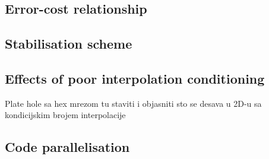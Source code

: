 \documentclass[sn-mathphys,Numbered]{sn-jnl}%
\newcommand{\bb}{\boldsymbol}
\begin{document}
\subsection{Error-cost relationship}

\subsection{Stabilisation scheme}

\subsection{Effects of poor interpolation conditioning}

Plate hole sa hex mrezom tu staviti i objasniti sto se desava u 2D-u sa kondicijskim brojem interpolacije

\subsection{Code parallelisation}


%


\end{document}
